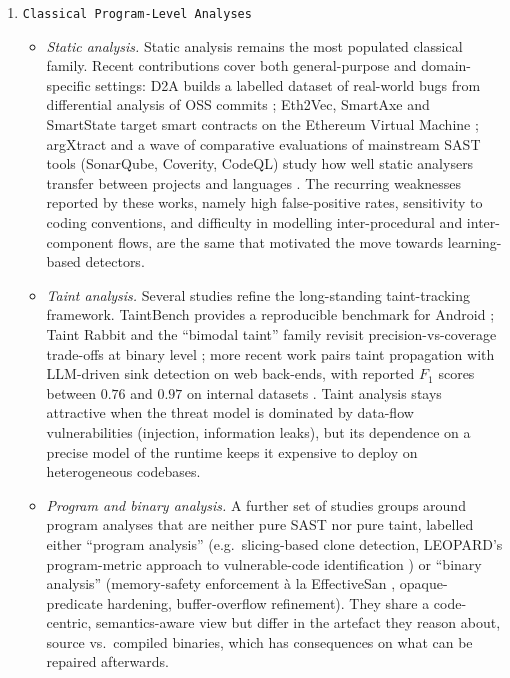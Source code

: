 \begin{enumerate}


\item \texttt{Classical Program-Level Analyses}
\label{subsubsec:rw-classical}

\begin{itemize}

  \item \textit{Static analysis.} Static analysis remains the most
        populated classical family. Recent contributions cover both
        general-purpose and domain-specific settings: D2A builds a
        labelled dataset of real-world bugs from differential analysis
        of OSS commits \citep{placeholder-d2a}; Eth2Vec, SmartAxe and
        SmartState target smart contracts on the Ethereum Virtual Machine
        \citep{placeholder-eth2vec,placeholder-smartaxe}; argXtract and a
        wave of comparative evaluations of mainstream SAST tools
        (SonarQube, Coverity, CodeQL) study how well static analysers
        transfer between projects and languages
        \citep{placeholder-sast-eval}. The recurring weaknesses reported
        by these works, namely high false-positive rates, sensitivity to
        coding conventions, and difficulty in modelling inter-procedural
        and inter-component flows, are the same that motivated the move
        towards learning-based detectors.

  \item \textit{Taint analysis.} Several studies refine the
        long-standing taint-tracking framework. TaintBench provides a
        reproducible benchmark for Android
        \citep{placeholder-taintbench}; Taint Rabbit and the
        ``bimodal taint'' family revisit precision-vs-coverage
        trade-offs at binary level \citep{placeholder-taint-rabbit};
        more recent work pairs taint propagation with LLM-driven sink
        detection on web back-ends, with reported $F_1$ scores between
        $0.76$ and $0.97$ on internal datasets
        \citep{placeholder-llm-taint}. Taint analysis stays attractive
        when the threat model is dominated by data-flow vulnerabilities
        (injection, information leaks), but its dependence on a precise
        model of the runtime keeps it expensive to deploy on
        heterogeneous codebases.

  \item \textit{Program and binary analysis.} A further set of studies
        groups around program analyses that are neither pure SAST nor
        pure taint, labelled either ``program analysis'' (e.g.\
        slicing-based clone detection, LEOPARD's program-metric approach
        to vulnerable-code identification \citep{placeholder-leopard}) or
        ``binary analysis'' (memory-safety enforcement \`{a} la
        EffectiveSan \citep{placeholder-effectivesan},
        opaque-predicate hardening, buffer-overflow refinement). They
        share a code-centric, semantics-aware view but differ in the
        artefact they reason about, source vs.\ compiled binaries,
        which has consequences on what can be repaired afterwards.


\end{itemize}
\end{enumerate}
